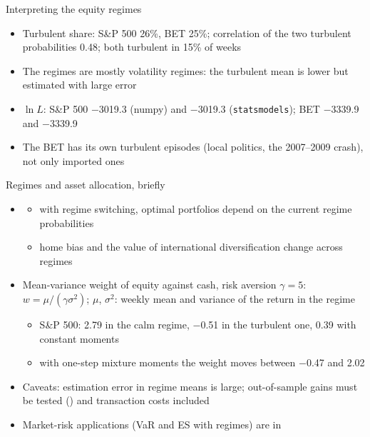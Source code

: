 \begin{frame}{Interpreting the equity regimes}
\itemsize{\small}
\begin{itemize}
    \item Turbulent share: S\&P 500 26\%, BET 25\%; correlation of the two turbulent probabilities 0.48; both turbulent in 15\% of weeks
    \item The regimes are mostly volatility regimes: the turbulent mean is lower but estimated with large error
    \item $\ln L$: S\&P 500 \ensuremath{-}3019.3 (numpy) and \ensuremath{-}3019.3 (\texttt{statsmodels}); BET \ensuremath{-}3339.9 and \ensuremath{-}3339.9
    \item The BET has its own turbulent episodes (local politics, the 2007--2009 crash), not only imported ones
\end{itemize}
\end{frame}

\begin{frame}{Regimes and asset allocation, briefly}
\itemsize{\small}
\begin{itemize}
    \item {}
    \begin{itemize}
        \item with regime switching, optimal portfolios depend on the current regime probabilities
        \item home bias and the value of international diversification change across regimes
    \end{itemize}
    \item Mean-variance weight of equity against cash, risk aversion $\gamma = 5$: $w = \mu/(\gamma\sigma^2)$; $\mu$, $\sigma^2$: weekly mean and variance of the return in the regime
    \begin{itemize}
        \item S\&P 500: 2.79 in the calm regime, \ensuremath{-}0.51 in the turbulent one, 0.39 with constant moments
        \item with one-step mixture moments the weight moves between \ensuremath{-}0.47 and 2.02
    \end{itemize}
    \item Caveats: estimation error in regime means is large; out-of-sample gains must be tested () and transaction costs included
    \item Market-risk applications (VaR and ES with regimes) are in 
\end{itemize}
\end{frame}



